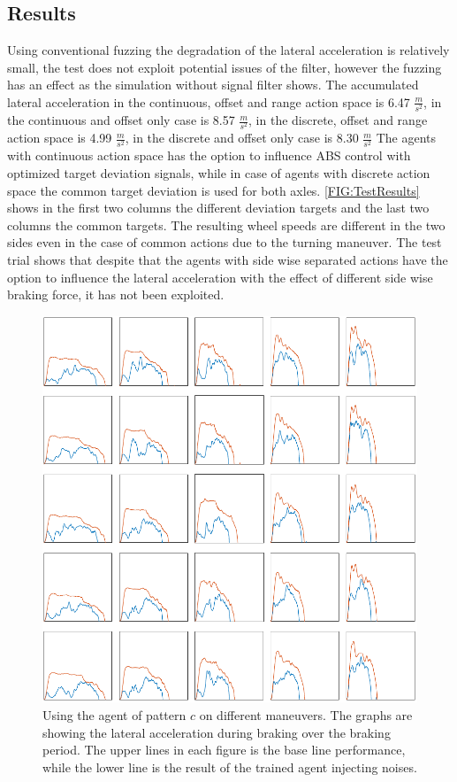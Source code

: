 \documentclass[a4paper, fleqn]{template/cas-dc}
\begin{document}
	\subsection{Results}
	Using conventional fuzzing the degradation of the lateral acceleration is relatively small, the test does not exploit potential issues of the filter, however the fuzzing has an effect as the simulation without signal filter shows. The accumulated lateral acceleration in the continuous, offset and range action space is 6.47 $\frac{m}{s^2}$, in the continuous and offset only case is 8.57 $\frac{m}{s^2}$, in the discrete, offset and range action space is 4.99 $\frac{m}{s^2}$, in the discrete and offset only case is 8.30 $\frac{m}{s^2}$ 
	The agents with continuous action space has the option to influence ABS control with optimized target deviation signals, while in case of agents with discrete action space the common target deviation is used for both axles. \autoref{FIG:TestResults} shows in the first two columns the different deviation targets and the last two columns the common targets. The resulting wheel speeds are different in the two sides even in the case of common actions due to the turning maneuver. The test trial shows that despite that the agents with side wise separated actions have the option to influence the lateral acceleration with the effect of different side wise braking force, it has not been exploited.
	
	\begin{figure}[h]
		\centering
		\includegraphics[width=\columnwidth]{figures/AgentPerformanceGrid.pdf}
		\caption{Using the agent of pattern $c$ on different maneuvers. The graphs are showing the lateral acceleration during braking over the braking period. The upper lines in each figure is the base line performance, while the lower line is the result of the trained agent injecting noises.}
		\label{FIG:PerformanceGrid}
	\end{figure}	
	
\end{document}
